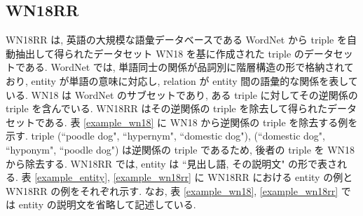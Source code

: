 \documentclass[twocolumn]{jarticle}
\begin{document}
\begin{table}[t]
    \centering
    \caption{WN18 から逆関係の triple を除去する例}
    \vspace{-3mm}
    \label{example_wn18}
\end{table}

\vspace{-1mm}
\subsection{WN18RR}

WN18RR \cite{wn18rr} は, 英語の大規模な語彙データベースである WordNet \cite{wordnet} から triple を自動抽出して得られたデータセット WN18 \cite{TransE_WN18} を基に作成された triple のデータセットである. WordNet では, 単語同士の関係が品詞別に階層構造の形で格納されており, entity が単語の意味に対応し, relation が entity 間の語彙的な関係を表している. WN18 は WordNet のサブセットであり, ある triple に対してその逆関係の triple を含んでいる. WN18RR はその逆関係の triple を除去して得られたデータセットである. 表 \ref{example_wn18} に WN18 から逆関係の triple を除去する例を示す. triple (``poodle dog", ``hypernym", ``domestic dog"), (``domestic dog", ``hyponym", ``poodle dog") は逆関係の triple であるため, 後者の triple を WN18 から除去する. WN18RR では, entity は ``見出し語, その説明文" の形で表される. 表 \ref{example_entity}, \ref{example_wn18rr} に WN18RR における entity の例と WN18RR の例をそれぞれ示す. なお, 表 \ref{example_wn18}, \ref{example_wn18rr} では entity の説明文を省略して記述している. \par
\end{document}
